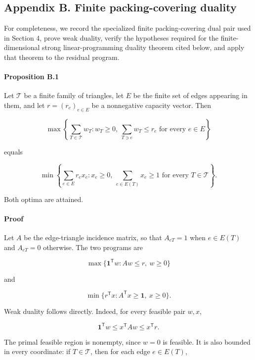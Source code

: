\documentclass[english,11pt,a4paper]{article}
\newcounter{none}
\begin{document}
\subsection{Appendix B. Finite packing-covering
duality}\label{appendix-b.-finite-packing-covering-duality}

For completeness, we record the specialized finite packing-covering dual
pair used in Section 4, prove weak duality, verify the hypotheses
required for the finite-dimensional strong linear-programming duality
theorem cited below, and apply that theorem to the residual program.

\paragraph{Proposition B.1}\label{proposition-b.1}

Let \(\mathcal T\) be a finite family of triangles, let \(E\) be the
finite set of edges appearing in them, and let \(r=(r_e)_{e\in E}\) be a
nonnegative capacity vector. Then

\[
\max\left\{
\sum_{T\in\mathcal T}w_T:
w_T\ge0,\ 
\sum_{T\ni e}w_T\le r_e
\text{ for every }e\in E
\right\}
\]

equals

\[
\min\left\{
\sum_{e\in E}r_ex_e:
x_e\ge0,\ 
\sum_{e\in E(T)}x_e\ge1
\text{ for every }T\in\mathcal T
\right\}.
\]

Both optima are attained.

\paragraph{Proof}\label{proof-2}

Let \(A\) be the edge-triangle incidence matrix, so that \(A_{eT}=1\)
when \(e\in E(T)\) and \(A_{eT}=0\) otherwise. The two programs are

\[
\max\{\mathbf 1^{\mathsf T}w:Aw\le r,\ w\ge0\}
\]

and

\[
\min\{r^{\mathsf T}x:A^{\mathsf T}x\ge\mathbf 1,\ x\ge0\}.
\]

Weak duality follows directly. Indeed, for every feasible pair \(w,x\),

\[
\mathbf 1^{\mathsf T}w
\le
x^{\mathsf T}Aw
\le
x^{\mathsf T}r.
\]

The primal feasible region is nonempty, since \(w=0\) is feasible. It is
also bounded in every coordinate: if \(T\in\mathcal T\), then for each
edge \(e\in E(T)\),
\end{document}

